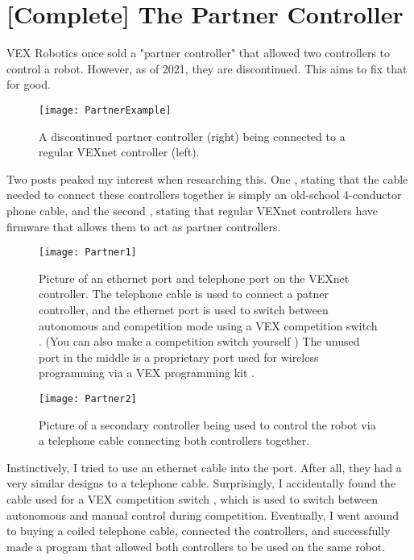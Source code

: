 \section{[Complete] The Partner Controller}

VEX Robotics once sold a "partner controller" that allowed two controllers to control a robot. However, as of 2021, they are discontinued. This aims to fix that for good.

\begin{figure}[h]
    \centering
    \texttt{[image: PartnerExample]}
    \caption{
        A discontinued partner controller (right) being connected to a regular VEXnet controller (left).
    }
\end{figure}

Two posts peaked my interest when researching this. One \cite{PartnerCite2}, stating that the cable needed to connect these controllers together is simply an old-school 4-conductor phone cable, and the second \cite{PartnerCite1}, stating that regular VEXnet controllers have firmware that allows them to act as partner controllers.

\begin{figure}[h]
    \centering
    \texttt{[image: Partner1]}
    \caption{
        Picture of an ethernet port and telephone port on the VEXnet controller. The telephone cable is used to connect a patner controller, and the ethernet port is used to switch between autonomous and competition mode using a VEX competition switch \cite{VEXCompSwitch}. (You can also make a competition switch yourself \cite{VEXDIYCompSwitch}) The unused port in the middle is a proprietary port used for wireless programming via a VEX programming kit \cite{VEXProgrammingKit}.
    }
\end{figure}


\begin{figure}[h]
    \centering
    \texttt{[image: Partner2]}
    \caption{
        Picture of a secondary controller being used to control the robot via a telephone cable connecting both controllers together. 
    }
\end{figure}

Instinctively, I tried to use an ethernet cable into the port. After all, they had a very similar designs to a telephone cable. Surprisingly, I accidentally found the cable used for a VEX competition switch \cite{VEXCompSwitch}, which is used to switch between autonomous and manual control during competition. Eventually, I went around to buying a coiled telephone cable, connected the controllers, and successfully made a program that allowed both controllers to be used on the same robot.
